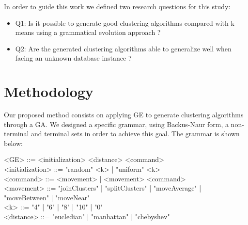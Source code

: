 \documentclass[journal]{IEEEtran}
\begin{document}
In order to guide this work we defined two research questions for this study:
\begin{itemize}
	\item Q1: Is it possible to generate good clustering algorithms
	compared with k-means using a grammatical evolution approach ? 
	\item Q2: Are the generated clustering algorithms able to generalize well when facing an unknown database instance ?
\end{itemize}

\section{Methodology} \label{sec:methodology}

Our proposed method consists on applying GE to generate clustering algorithms through a GA. We designed a specific grammar, using  Backus-Naur form, a non-terminal and terminal sets in order to achieve this goal. The grammar is shown below:

\begin{grammar}
	<GE> ::= <initialization> <distance> <command> 
	\\ <initialization> ::= "random" <k> | "uniform" <k>
	\\ <command> ::= <movement> | <movement> <command>
	\\ <movement> ::= "joinClusters" | "splitClusters" | "moveAverage" | "moveBetween" | "moveNear" 
	\\ <k> ::= "4" | "6" | "8" | "10" | "0"
	\\ <distance> ::= "eucledian" | "manhattan" | "chebyshev"
	\label{ge-clustering-grammar}
\end{grammar}
\end{document}
